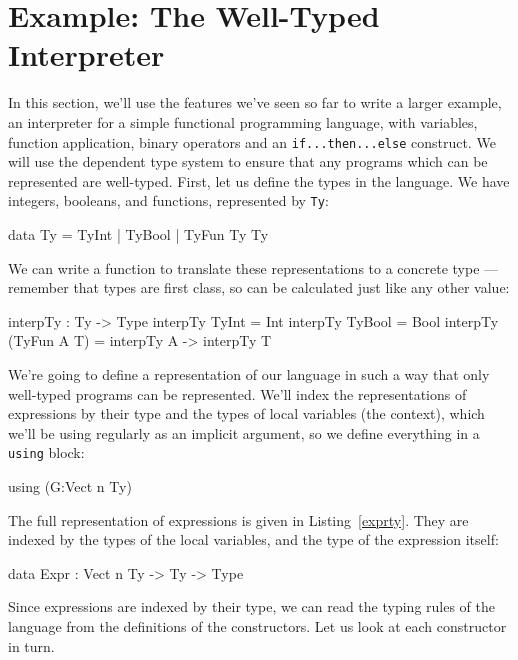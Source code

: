 \section{Example: The Well-Typed Interpreter}
\label{sect:interp}

In this section, we'll use the features we've seen so far to write a larger example, an interpreter for a simple functional programming language, with variables, function application, binary operators and an \texttt{if...then...else} construct.
We will use the dependent type system to ensure that any programs which can be represented are well-typed.
First, let us define the types in the language.
We have integers, booleans, and functions, represented by \texttt{Ty}:

\begin{code}
data Ty = TyInt | TyBool | TyFun Ty Ty
\end{code}

\noindent
We can write a function to translate these representations to a concrete \Idris{} type --- remember that types are first class, so can be calculated just like any other value:

\begin{code}
interpTy : Ty -> Type
interpTy TyInt       = Int
interpTy TyBool      = Bool
interpTy (TyFun A T) = interpTy A -> interpTy T
\end{code}

\noindent
We're going to define a representation of our language in such a way that only well-typed programs can be represented.
We'll index the representations of expressions by their type and the types of local variables (the context), which we'll be using regularly as an implicit argument, so we define everything in a \texttt{using} block:

\begin{code}
using (G:Vect n Ty)
\end{code}

\noindent
The full representation of expressions is given in Listing~\ref{exprty}.
They are indexed by the types of the local variables, and the type of the expression itself:

\begin{code}
data Expr : Vect n Ty -> Ty -> Type
\end{code}

\noindent
Since expressions are indexed by their type, we can read the typing rules of the language from the definitions of the constructors.
Let us look at each constructor in turn.


